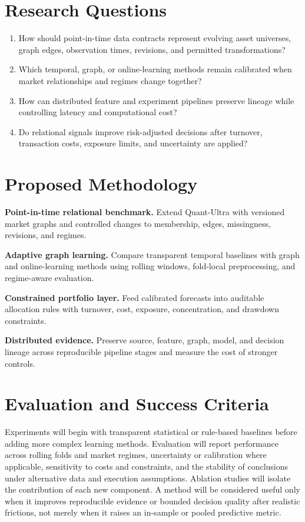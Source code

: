 \documentclass[11pt]{article}
\begin{document}
\section*{Research Questions}
\begin{enumerate}
\item How should point-in-time data contracts represent evolving asset universes, graph edges, observation times, revisions, and permitted transformations?
\item Which temporal, graph, or online-learning methods remain calibrated when market relationships and regimes change together?
\item How can distributed feature and experiment pipelines preserve lineage while controlling latency and computational cost?
\item Do relational signals improve risk-adjusted decisions after turnover, transaction costs, exposure limits, and uncertainty are applied?
\end{enumerate}

\section*{Proposed Methodology}
\textbf{Point-in-time relational benchmark.} Extend Quant-Ultra with versioned market graphs and controlled changes to membership, edges, missingness, revisions, and regimes.

\textbf{Adaptive graph learning.} Compare transparent temporal baselines with graph and online-learning methods using rolling windows, fold-local preprocessing, and regime-aware evaluation.

\textbf{Constrained portfolio layer.} Feed calibrated forecasts into auditable allocation rules with turnover, cost, exposure, concentration, and drawdown constraints.

\textbf{Distributed evidence.} Preserve source, feature, graph, model, and decision lineage across reproducible pipeline stages and measure the cost of stronger controls.

\section*{Evaluation and Success Criteria}
Experiments will begin with transparent statistical or rule-based baselines before adding more complex learning methods. Evaluation will report performance across rolling folds and market regimes, uncertainty or calibration where applicable, sensitivity to costs and constraints, and the stability of conclusions under alternative data and execution assumptions. Ablation studies will isolate the contribution of each new component. A method will be considered useful only when it improves reproducible evidence or bounded decision quality after realistic frictions, not merely when it raises an in-sample or pooled predictive metric.
\end{document}

